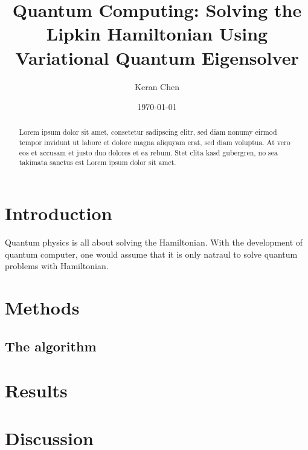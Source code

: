 \documentclass[english,notitlepage,reprint,nofootinbib]{revtex4-1}
\begin{document}
\title{Quantum Computing: Solving the Lipkin Hamiltonian Using Variational Quantum Eigensolver}
\author{Keran Chen} %
\date{\today}                             %
\noaffiliation                            %

\begin{abstract}
    
Lorem ipsum dolor sit amet, consetetur sadipscing elitr, sed diam nonumy eirmod tempor invidunt ut labore et dolore magna aliquyam erat, sed diam voluptua. At vero eos et accusam et justo duo dolores et ea rebum. Stet clita kasd gubergren, no sea takimata sanctus est Lorem ipsum dolor sit amet.

\end{abstract}
\maketitle


\section{Introduction}\label{sec:intro}
Quantum physics is all about solving the Hamiltonian. With the development of quantum computer, one would assume that it is only natraul to solve quantum problems with Hamiltonian.


%

\section{Methods}\label{sec:methods}
%

\subsection*{The algorithm}\label{sec:algo}
%

\section{Results}\label{sec:results}
%
\section{Discussion}\label{sec:discussion}
%
\end{document}
